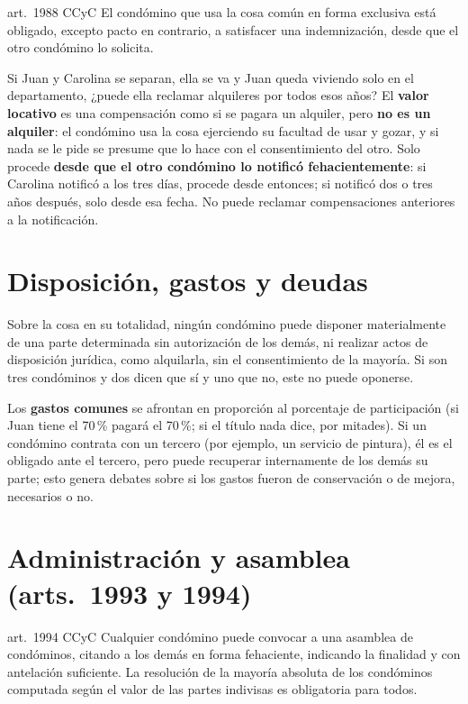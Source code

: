 \documentclass[12pt,oneside]{book}
\begin{document}
\begin{regla}{art.~1988 CCyC}
El condómino que usa la cosa común en forma exclusiva está obligado, excepto pacto en contrario, a satisfacer una indemnización, desde que el otro condómino lo solicita.
\end{regla}

Si Juan y Carolina se separan, ella se va y Juan queda viviendo solo en el departamento, ¿puede ella reclamar alquileres por todos esos años? El \textbf{valor locativo} es una compensación como si se pagara un alquiler, pero \textbf{no es un alquiler}: el condómino usa la cosa ejerciendo su facultad de usar y gozar, y si nada se le pide se presume que lo hace con el consentimiento del otro. Solo procede \textbf{desde que el otro condómino lo notificó fehacientemente}: si Carolina notificó a los tres días, procede desde entonces; si notificó dos o tres años después, solo desde esa fecha. No puede reclamar compensaciones anteriores a la notificación.

\section{Disposición, gastos y deudas}

Sobre la cosa en su totalidad, ningún condómino puede disponer materialmente de una parte determinada sin autorización de los demás, ni realizar actos de disposición jurídica, como alquilarla, sin el consentimiento de la mayoría. Si son tres condóminos y dos dicen que sí y uno que no, este no puede oponerse.

Los \textbf{gastos comunes} se afrontan en proporción al porcentaje de participación (si Juan tiene el 70\,\% pagará el 70\,\%; si el título nada dice, por mitades). Si un condómino contrata con un tercero (por ejemplo, un servicio de pintura), él es el obligado ante el tercero, pero puede recuperar internamente de los demás su parte; esto genera debates sobre si los gastos fueron de conservación o de mejora, necesarios o no.

\section{Administración y asamblea (arts.~1993 y 1994)}

\begin{regla}{art.~1994 CCyC}
Cualquier condómino puede convocar a una asamblea de condóminos, citando a los demás en forma fehaciente, indicando la finalidad y con antelación suficiente. La resolución de la mayoría absoluta de los condóminos computada según el valor de las partes indivisas es obligatoria para todos.
\end{regla}
\end{document}
